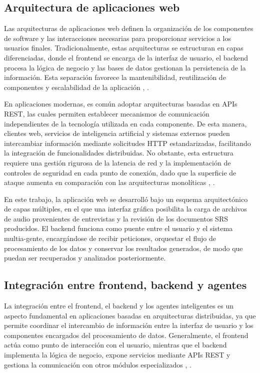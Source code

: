 \subsection{Arquitectura de aplicaciones web}

Las arquitecturas de aplicaciones web definen la organización de los componentes de software y las interacciones necesarias para proporcionar 
servicios a los usuarios finales. Tradicionalmente, estas arquitecturas se estructuran en capas diferenciadas, donde el frontend se encarga de 
la interfaz de usuario, el backend procesa la lógica de negocio y las bases de datos gestionan la persistencia de la información. Esta separación 
favorece la mantenibilidad, reutilización de componentes y escalabilidad de la aplicación \cite{richards2020fundamentals}, \cite{newman2021building}.

En aplicaciones modernas, es común adoptar arquitecturas basadas en APIs REST, las cuales permiten establecer mecanismos de comunicación independientes 
de la tecnología utilizada en cada componente. De esta manera, clientes web, servicios de inteligencia artificial y sistemas externos pueden 
intercambiar información mediante solicitudes HTTP estandarizadas, facilitando la integración de funcionalidades distribuidas. No obstante, 
esta estructura requiere una gestión rigurosa de la latencia de red y la implementación de controles de seguridad en cada punto de conexión, 
dado que la superficie de ataque aumenta en comparación con las arquitecturas monolíticas \cite{newman2021building}, \cite{richards2020fundamentals}.

En este trabajo, la aplicación web se desarrolló bajo un esquema arquitectónico de capas múltiples, en el que una interfaz gráfica posibilita 
la carga de archivos de audio provenientes de entrevistas y la revisión de los documentos SRS producidos. El backend funciona como puente entre 
el usuario y el sistema multia-gente, encargándose de recibir peticiones, orquestar el flujo de procesamiento de los datos y conservar los resultados 
generados, de modo que puedan ser recuperados y analizados posteriormente.

\subsection{Integración entre frontend, backend y agentes}

La integración entre el frontend, el backend y los agentes inteligentes es un aspecto fundamental en aplicaciones basadas en arquitecturas 
distribuidas, ya que permite coordinar el intercambio de información entre la interfaz de usuario y los componentes encargados del procesamiento 
de datos. Generalmente, el frontend actúa como punto de interacción con el usuario, mientras que el backend implementa la lógica de negocio, 
expone servicios mediante APIs REST y gestiona la comunicación con otros módulos especializados \cite{richards2020fundamentals}, \cite{newman2021building}.

